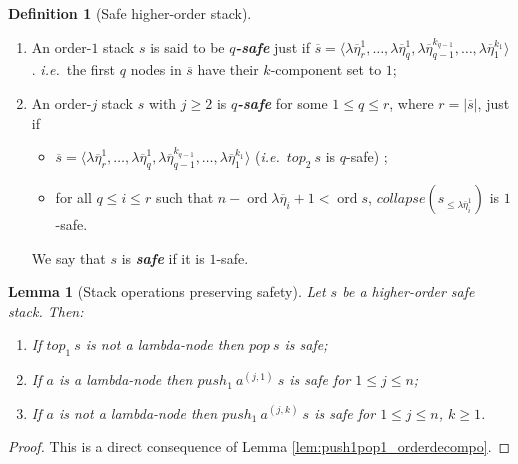 \documentclass{article}
\newcommand{\ord}{\mathop{\mathrm{ord}}}
\newcommand{\prefixof}{\leqslant}
\newcommand\defname[1]{{\bf\em #1}\index{#1}}
\newtheorem{lemma}{Lemma}[section]
\theoremstyle{remark}
\theoremstyle{definition}
\newtheorem{definition}{Definition}[section]
\newcommand\orddec\overline
\begin{document}
\begin{definition}[Safe higher-order stack]
\label{dfn:safestack} \
\begin{enumerate}[1.]
\item An order-$1$ stack $s$
is said to be \defname{$q$-safe} just if $\orddec{s} = \langle \lambda \overline{\eta}_r^1, \ldots ,
\lambda \overline{\eta}_q^1, \lambda
\overline{\eta}_{q-1}^{k_{q-1}}, \ldots , \lambda
\overline{\eta}_1^{k_1} \rangle$. {\it i.e.}~the first $q$ nodes in $\orddec{s}$ have their $k$-component
set to $1$;

\item An order-$j$ stack $s$ with $j\geq2$ is
\defname{$q$-safe} for some $1 \leq q \leq r$, where $r = |\orddec{s}|$, just if
\begin{itemize}
\item $\orddec{s} = \langle \lambda \overline{\eta}_r^1, \ldots ,
\lambda \overline{\eta}_q^1, \lambda
\overline{\eta}_{q-1}^{k_{q-1}}, \ldots , \lambda
\overline{\eta}_1^{k_1} \rangle$ ({\it i.e.}~$top_2\ s$ is $q$-safe) ;
\item for all $q \leq i \leq r$ such that $n-\ord{\lambda \overline{\eta}_i}+1 <
\ord{s}$, $collapse (s_{\prefixof \lambda \overline{\eta}_i^1})$ is $1$-safe.
\end{itemize}
We say that $s$ is \defname{safe} if it is $1$-safe.
\end{enumerate}
\end{definition}


\begin{lemma}[Stack operations preserving safety]
\label{lem:push1pop1_preserves_safety} Let $s$ be a higher-order
safe stack. Then:
\begin{enumerate}
  \item If $top_1\ s$ is not a lambda-node then $pop\ s$ is safe;
  \item If $a$ is a lambda-node then $push_1\ a^{(j,1)}\ s$ is safe for $1 \leq j \leq n$;
  \item If $a$ is not a lambda-node then $push_1\ a^{(j,k)}\ s$
is safe for $1 \leq j \leq n$, $k \geq 1$.
\end{enumerate}
\end{lemma}
\begin{proof}
This is a direct consequence of Lemma
\ref{lem:push1pop1_orderdecompo}.
\end{proof}
\end{document}
